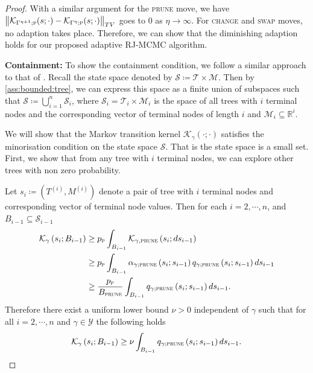 \documentclass[
12pt]{article}
\begin{document}
\begin{proof}
		With a similar argument for the \textsc{prune} move, we have $\left\|\mathcal{K}_{\Gamma^{\eta+1};\textsc{p}}(s;\cdot)-\mathcal{K}_{\Gamma^{\eta};\textsc{p}}(s;\cdot)\right\|_{TV}$ goes to 0 as $\eta\to \infty$. For \textsc{change} and \textsc{swap} moves, no adaption takes place. Therefore, we can show that the diminishing adaption holds for our proposed adaptive RJ-MCMC algorithm.
		
		\textbf{Containment:}
		To show the containment condition, we follow a similar approach to that of \citet{andrieu_RJ_MCMC}. Recall the state space denoted by $\mathcal{S}\coloneqq\mathcal{T}\times\mathcal{M}$. Then by \cref{ass:bounded:tree}, we can express this space as a finite union of subspaces such that $\mathcal{S} \coloneq \bigcup_{i=1}^n \mathcal{S}_i$, where $\mathcal{S}_i = \mathcal{T}_i \times \mathcal{M}_i$ is the space of all trees with $i$ terminal nodes and the corresponding vector of terminal nodes of length $i$ and $\mathcal{M}_i\subseteq\mathbb{R}^i$. 
		
		We will show that the Markov transition kernel $\mathcal{K}_{\gamma}(\cdot;\cdot)$ satisfies the minorisation condition \citep{meyn_tweedie1994} on the state space $\mathcal{S}$. That is the state space is a small set. First, we show that from any tree with $i$ terminal nodes, we can explore other trees with non zero probability.
		
		Let $s_i \coloneqq\left(T^{(i)}, M^{(i)}\right)$ denote a pair of tree with $i$ terminal nodes and corresponding vector of terminal node values. Then for each $i=2,\cdots,n$, and $B_{i-1}\subseteq \mathcal{S}_{i-1}$
		\begin{align*}
			\mathcal{K}_{\gamma}\left(s_i;B_{i-1}\right)
			&\ge p_{\textsc{p}}\int_{B_{i-1}}\mathcal{K}_{\gamma,\textsc{prune}}\left(s_i;ds_{i-1}\right)\\
			&\ge p_{\textsc{p}}\int_{B_{i-1}}\alpha_{\gamma;\textsc{prune}}\left(s_i;s_{i-1}\right)q_{\gamma;\textsc{prune}}\left(s_i;s_{i-1}\right)ds_{i-1}\\
			&\ge \frac{p_{\textsc{p}}}{B_{\textsc{prune}}}\int_{B_{i-1}}q_{\gamma;\textsc{prune}}\left(s_i;s_{i-1}\right)ds_{i-1}.
		\end{align*}
		Therefore there exist a uniform lower bound $\nu>0$ independent of $\gamma$ such that for all $i=2,\cdots,n$ and $\gamma\in \mathcal{Y}$ the following holds
		\begin{equation}\label{eq:reach:trivial}
			\mathcal{K}_{\gamma}\left(s_i;B_{i-1}\right)
			\ge \nu\int_{B_{i-1}}q_{\gamma;\textsc{prune}}\left(s_i;s_{i-1}\right)ds_{i-1}.
		\end{equation}
		

\end{proof}
\end{document}

